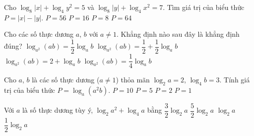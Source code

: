 \begin{ex}%
	Cho $\log_8 |x|+\log_4 y^2=5$ và $\log_8 |y|+\log_4 x^2=7$. Tìm giá trị  của biểu thức $P=|x|-|y|$.
	\choice 
		{\True  $P=56$}
		{$P=16$} 
		{$P=8$} 
		 {$P=64$}
\end{ex}

\begin{ex}%
	Cho các số thực dương $a$, $b$ với $a\ne 1$. Khẳng định nào sau đây là  khẳng định đúng?
	 \choice
		 {$\log _{a^2} (ab)=\dfrac{1}{2} \log_a b$}
		{\True $\log _{a^2} (ab)=\dfrac{1}{2}+\dfrac{1}{2} \log_a  b$}
		 {$\log _{a^2} (ab)=2+\log_a b$}
		{$\log _{a^2} (ab)=\dfrac{1}{4}  \log_a b$}
\end{ex}

\begin{ex}%
	Cho $a$, $b$ là các  số thực dương ($ a\ne 1$) thỏa mãn $\log_2{a}=2$, $ \log_4 b=3$. Tính giá trị của biểu thức $P=\log_a (a^2b)$.
	 \choice
		{$P=10$} 
		{\True  $P=5$}
		{$P=2$} 
		 {$P=1$}
\end{ex}

\begin{ex}%
	Với $a$ là số thực dương tùy ý, $\log _2a^2+\log  _4a$ bằng
	\choice 
		{$\dfrac{3}{2}\log  _2a$}
		{\True $\dfrac{5}{2}\log  _2a$}
		{$\log  _2a$}
		 {$\dfrac{1}{2}\log _2a$}
\end{ex}

